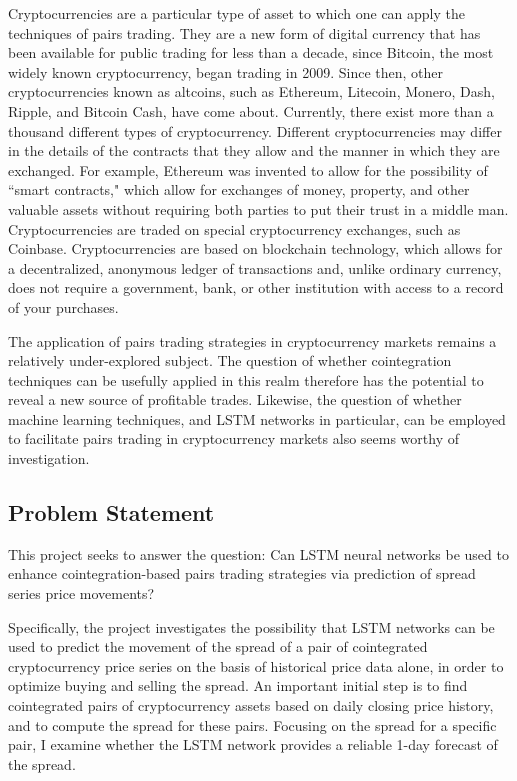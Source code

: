 \documentclass{article}
\begin{document}
Cryptocurrencies are a particular type of asset to which one can apply the techniques of pairs trading. They are a new form of digital currency that has been available for public trading for less than a decade, since Bitcoin, the most widely known cryptocurrency, began trading in 2009.  Since then, other cryptocurrencies known as altcoins, such as Ethereum, Litecoin, Monero, Dash, Ripple, and Bitcoin Cash, have come about. Currently, there exist more than a thousand different types of cryptocurrency. Different cryptocurrencies may differ in the details of the contracts that they allow and the manner in which they are exchanged. For example, Ethereum was invented to allow for the possibility of ``smart contracts," which allow for exchanges of money, property, and other valuable assets without requiring both parties to put their trust in a middle man. Cryptocurrencies are traded on special cryptocurrency exchanges, such as Coinbase. Cryptocurrencies are based on blockchain technology, which allows for a decentralized, anonymous ledger of transactions and, unlike ordinary currency, does not require a government, bank, or other institution with access to a record of your purchases. 

The application of pairs trading strategies in cryptocurrency markets remains a relatively under-explored subject. The question of whether cointegration techniques can be usefully applied in this realm therefore has the potential to reveal a new source of profitable trades. Likewise, the question of whether machine learning techniques, and LSTM networks in particular, can be employed to facilitate pairs trading in cryptocurrency markets also seems worthy of investigation. 

\subsection{Problem Statement}

This project seeks to answer the question: Can LSTM neural networks be used to enhance cointegration-based pairs trading strategies via prediction of spread series price movements?

Specifically, the project investigates the possibility that LSTM networks can be used to predict the movement of the spread of a pair of cointegrated cryptocurrency price series on the basis of historical price data alone, in order to optimize buying and selling the spread. An important  initial step is to find cointegrated pairs of cryptocurrency assets based on daily closing price history, and to compute the spread for these pairs. Focusing on the spread for a specific pair, I examine whether the LSTM network provides a reliable 1-day forecast of the spread. 
\end{document}

